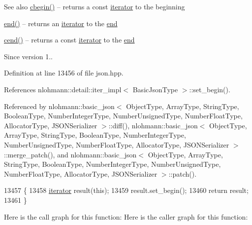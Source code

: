 \begin{DoxySeeAlso}{See also}
\hyperlink{classnlohmann_1_1basic__json_ad865d6c291b237ae508d5cb2146b5877}{cbegin()} -- returns a const \hyperlink{classnlohmann_1_1basic__json_a099316232c76c034030a38faa6e34dca}{iterator} to the beginning 

\hyperlink{classnlohmann_1_1basic__json_a13e032a02a7fd8a93fdddc2fcbc4763c}{end()} -- returns an \hyperlink{classnlohmann_1_1basic__json_a099316232c76c034030a38faa6e34dca}{iterator} to the \hyperlink{classnlohmann_1_1basic__json_a13e032a02a7fd8a93fdddc2fcbc4763c}{end} 

\hyperlink{classnlohmann_1_1basic__json_a8dba7b7d2f38e6b0c614030aa43983f6}{cend()} -- returns a const \hyperlink{classnlohmann_1_1basic__json_a099316232c76c034030a38faa6e34dca}{iterator} to the \hyperlink{classnlohmann_1_1basic__json_a13e032a02a7fd8a93fdddc2fcbc4763c}{end}
\end{DoxySeeAlso}
\begin{DoxySince}{Since}
version 1.. 
\end{DoxySince}


Definition at line 13456 of file json.\+hpp.



References nlohmann\+::detail\+::iter\+\_\+impl$<$ Basic\+Json\+Type $>$\+::set\+\_\+begin().



Referenced by nlohmann\+::basic\+\_\+json$<$ Object\+Type, Array\+Type, String\+Type, Boolean\+Type, Number\+Integer\+Type, Number\+Unsigned\+Type, Number\+Float\+Type, Allocator\+Type, J\+S\+O\+N\+Serializer $>$\+::diff(), nlohmann\+::basic\+\_\+json$<$ Object\+Type, Array\+Type, String\+Type, Boolean\+Type, Number\+Integer\+Type, Number\+Unsigned\+Type, Number\+Float\+Type, Allocator\+Type, J\+S\+O\+N\+Serializer $>$\+::merge\+\_\+patch(), and nlohmann\+::basic\+\_\+json$<$ Object\+Type, Array\+Type, String\+Type, Boolean\+Type, Number\+Integer\+Type, Number\+Unsigned\+Type, Number\+Float\+Type, Allocator\+Type, J\+S\+O\+N\+Serializer $>$\+::patch().


\begin{DoxyCode}
13457     \{
13458         \hyperlink{classnlohmann_1_1basic__json_a099316232c76c034030a38faa6e34dca}{iterator} result(\textcolor{keyword}{this});
13459         result.set\_begin();
13460         \textcolor{keywordflow}{return} result;
13461     \}
\end{DoxyCode}
Here is the call graph for this function\+:
Here is the caller graph for this function\+:
\mbox{\label{classnlohmann_1_1basic__json_a4f0f5dd42b2987ff20306ed78bd31d1d}} 
